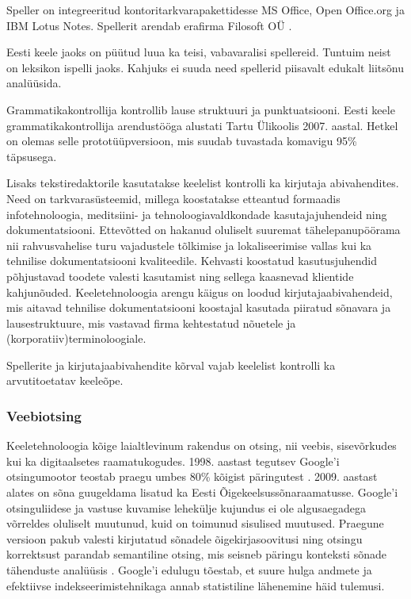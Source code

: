 \documentclass[]{../metanetpaper}
\begin{document}
\begin{multicols}{2}
Speller on integreeritud kontoritarkvarapakettidesse MS Office, Open Office.org ja IBM Lotus Notes. 
Spellerit arendab era\-firma Filosoft OÜ \cite{Filosoft}.

Eesti keele jaoks on püütud luua ka teisi, vabavaralisi spellereid. 
Tuntuim neist on leksikon ispelli jaoks. 
Kahjuks ei suuda need spellerid piisavalt edukalt liitsõnu analüüsida.

Grammatikakontrollija kontrollib lause struktuuri ja punktuatsiooni. 
Eesti keele grammatikakontrollija arendustööga alustati Tartu Ülikoolis 2007. aastal.
Hetkel on olemas selle prototüüpversioon, mis suu\-dab tuvastada komavigu 95\% täpsusega.

Lisaks tekstiredaktorile kasutatakse keelelist kontrolli ka kirjutaja abivahendites. 
Need on tarkvarasüsteemid, millega koostatakse etteantud formaadis infotehnoloogia, meditsiini- ja tehnoloogiavaldkondade kasutajajuhendeid ning dokumentatsiooni. 
Ettevõtted on hakanud oluliselt suuremat tähelepanupöörama nii rahvusvahelise turu vajadustele tõlkimise ja lokaliseerimise vallas kui ka tehnilise dokumentatsiooni kvaliteedile. 
Kehvasti koostatud kasutusjuhendid põhjustavad toodete valesti kasutamist ning sellega kaasnevad klientide kahjunõuded. 
Keeletehnoloogia arengu käigus on loodud kirjutajaabivahendeid, mis aitavad tehnilise dokumentatsiooni koostajal kasutada piiratud sõnavara ja lausestruktuure, mis vastavad firma kehtestatud nõuetele ja (korporatiiv)terminoloogiale. 

Spellerite ja kirjutajaabivahendite kõrval vajab keelelist kontrolli ka arvutitoetatav keeleõpe. 

\subsubsection{Veebiotsing}

Keeletehnoloogia kõige laialtlevinum rakendus on otsing, nii veebis, sisevõrkudes kui ka digitaalsetes raamatukogudes. 
1998. aastast tegutsev Google’i otsingumootor teostab praegu umbes 80\% kõigist päringutest \cite{spi1}. 
2009. aastast alates on sõna guugeldama lisatud ka Eesti Õigekeelsussõnaraamatusse. 
Google’i otsinguliidese ja vastuse kuvamise lehekülje kujundus ei ole algusaegadega võrreldes oluliselt muutunud, kuid on toimunud sisulised muutused. 
Praegune versioon pakub valesti kirjutatud sõnadele õigekirjasoovitusi ning otsingu korrektsust parandab semantiline otsing, mis seisneb päringu konteksti sõnade tähenduste analüüsis \cite{pc1}. 
Google’i edulugu tõestab, et suure hulga andmete ja efektiivse indekseerimistehnikaga annab statistiline lähenemine häid tulemusi. 


\end{multicols}
\end{document}
